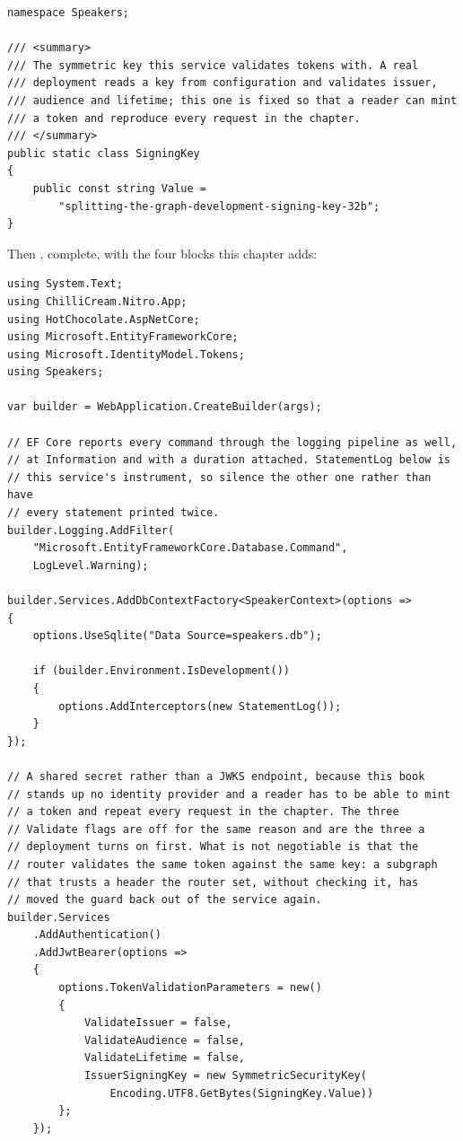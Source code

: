 \begin{verbatim}
namespace Speakers;

/// <summary>
/// The symmetric key this service validates tokens with. A real
/// deployment reads a key from configuration and validates issuer,
/// audience and lifetime; this one is fixed so that a reader can mint
/// a token and reproduce every request in the chapter.
/// </summary>
public static class SigningKey
{
    public const string Value =
        "splitting-the-graph-development-signing-key-32b";
}
\end{verbatim}

%
Then , complete, with the four blocks this chapter adds:

\begin{verbatim}
using System.Text;
using ChilliCream.Nitro.App;
using HotChocolate.AspNetCore;
using Microsoft.EntityFrameworkCore;
using Microsoft.IdentityModel.Tokens;
using Speakers;

var builder = WebApplication.CreateBuilder(args);

// EF Core reports every command through the logging pipeline as well,
// at Information and with a duration attached. StatementLog below is
// this service's instrument, so silence the other one rather than have
// every statement printed twice.
builder.Logging.AddFilter(
    "Microsoft.EntityFrameworkCore.Database.Command",
    LogLevel.Warning);

builder.Services.AddDbContextFactory<SpeakerContext>(options =>
{
    options.UseSqlite("Data Source=speakers.db");

    if (builder.Environment.IsDevelopment())
    {
        options.AddInterceptors(new StatementLog());
    }
});

// A shared secret rather than a JWKS endpoint, because this book
// stands up no identity provider and a reader has to be able to mint
// a token and repeat every request in the chapter. The three
// Validate flags are off for the same reason and are the three a
// deployment turns on first. What is not negotiable is that the
// router validates the same token against the same key: a subgraph
// that trusts a header the router set, without checking it, has
// moved the guard back out of the service again.
builder.Services
    .AddAuthentication()
    .AddJwtBearer(options =>
    {
        options.TokenValidationParameters = new()
        {
            ValidateIssuer = false,
            ValidateAudience = false,
            ValidateLifetime = false,
            IssuerSigningKey = new SymmetricSecurityKey(
                Encoding.UTF8.GetBytes(SigningKey.Value))
        };
    });


\end{verbatim}
